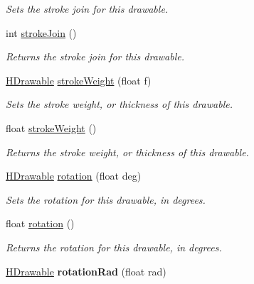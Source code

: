 \begin{DoxyCompactItemize}
\begin{DoxyCompactList}\small\item\em Sets the stroke join for this drawable. \end{DoxyCompactList}\item 
int \hyperlink{classhype_1_1drawable_1_1_h_drawable_aa0f8402fa01dd4a77cb2f46fd869e290}{stroke\-Join} ()
\begin{DoxyCompactList}\small\item\em Returns the stroke join for this drawable. \end{DoxyCompactList}\item 
\hyperlink{classhype_1_1drawable_1_1_h_drawable}{H\-Drawable} \hyperlink{classhype_1_1drawable_1_1_h_drawable_a35e86b46f7a87e0caf41b005d9579bbb}{stroke\-Weight} (float f)
\begin{DoxyCompactList}\small\item\em Sets the stroke weight, or thickness of this drawable. \end{DoxyCompactList}\item 
float \hyperlink{classhype_1_1drawable_1_1_h_drawable_addcad70b22c1df45f52562394e4db624}{stroke\-Weight} ()
\begin{DoxyCompactList}\small\item\em Returns the stroke weight, or thickness of this drawable. \end{DoxyCompactList}\item 
\hyperlink{classhype_1_1drawable_1_1_h_drawable}{H\-Drawable} \hyperlink{classhype_1_1drawable_1_1_h_drawable_a65ca80c8327fd73cfb6c459d5fe03032}{rotation} (float deg)
\begin{DoxyCompactList}\small\item\em Sets the rotation for this drawable, in degrees. \end{DoxyCompactList}\item 
float \hyperlink{classhype_1_1drawable_1_1_h_drawable_a8eb40202a2ff44b5cf530240bd390be4}{rotation} ()
\begin{DoxyCompactList}\small\item\em Returns the rotation for this drawable, in degrees. \end{DoxyCompactList}\item 
\hypertarget{classhype_1_1drawable_1_1_h_drawable_a0e4d63f112b6904b084c2f8eca8757df}{\hyperlink{classhype_1_1drawable_1_1_h_drawable}{H\-Drawable} {\bfseries rotation\-Rad} (float rad)}\label{classhype_1_1drawable_1_1_h_drawable_a0e4d63f112b6904b084c2f8eca8757df}


\end{DoxyCompactItemize}
